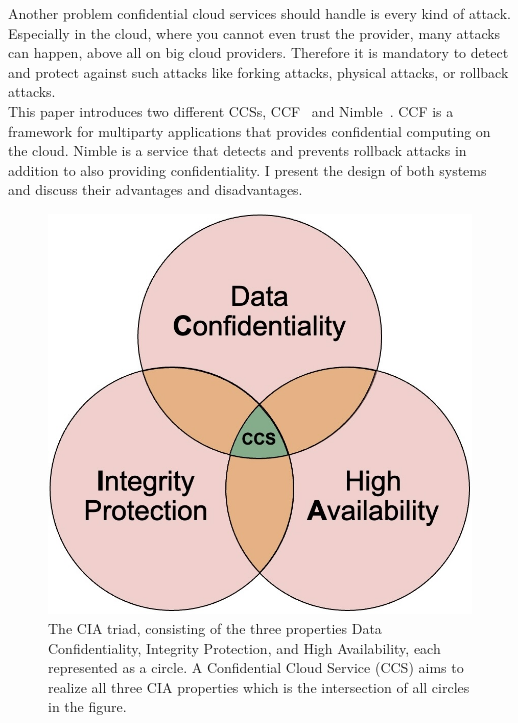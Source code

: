  Another problem confidential cloud services should handle is every kind of attack. Especially in the cloud, where you cannot even trust the provider, many attacks can happen, above all on big cloud providers. Therefore it is mandatory to detect and protect against such attacks like forking attacks, physical attacks, or rollback attacks.\\
 This paper introduces two different CCSs, CCF~\cite{Howard} and Nimble~\cite{Nimble}. CCF is a framework for multiparty applications that provides confidential computing on the cloud. Nimble is a service that detects and prevents rollback attacks in addition to also providing confidentiality. I present the design of both systems and discuss their advantages and disadvantages.
	 
 \begin{figure}[t]
	\includegraphics[scale=0.17]{pictures/cia_new}
	\caption{The CIA triad, consisting of the three properties Data Confidentiality, Integrity Protection, and High Availability, each represented as a circle. A Confidential Cloud Service (CCS) aims to realize all three CIA properties which is the intersection of all circles in the figure.  }
	\label{cia}
\end{figure}